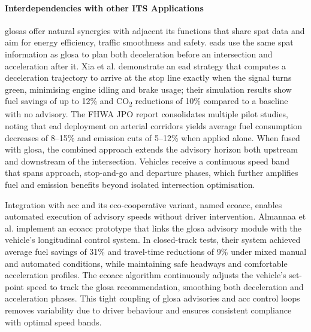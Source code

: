 \paragraph{Interdependencies with other ITS Applications}

\acp{glosa} offer natural synergies with adjacent \ac{its} functions that share \ac{spat} data and aim for energy efficiency, traffic smoothness and safety. \acp{ead} use the same \ac{spat} information as \ac{glosa} to plan both deceleration before an intersection and acceleration after it. Xia et al. \cite{Xia2014} demonstrate an \ac{ead} strategy that computes a deceleration trajectory to arrive at the stop line exactly when the signal turns green, minimising engine idling and brake usage; their simulation results show fuel savings of up to 12\% and CO\textsubscript{2} reductions of 10\% compared to a baseline with no advisory. The FHWA JPO report \cite{FHWA2016} consolidates multiple pilot studies, noting that \ac{ead} deployment on arterial corridors yields average fuel consumption decreases of 8–15\% and emission cuts of 5–12\% when applied alone. When fused with \ac{glosa}, the combined approach extends the advisory horizon both upstream and downstream of the intersection. Vehicles receive a continuous speed band that spans approach, stop-and-go and departure phases, which further amplifies fuel and emission benefits beyond isolated intersection optimisation.

Integration with \ac{acc} and its eco-cooperative variant, named \ac{ecoacc}, enables automated execution of advisory speeds without driver intervention. Almannaa et al. \cite{Almannaa2019} implement an \ac{ecoacc} prototype that links the \ac{glosa} advisory module with the vehicle’s longitudinal control system. In closed-track tests, their system achieved average fuel savings of 31\% and travel-time reductions of 9\% under mixed manual and automated conditions, while maintaining safe headways and comfortable acceleration profiles. The \ac{ecoacc} algorithm continuously adjusts the vehicle’s set-point speed to track the \ac{glosa} recommendation, smoothing both deceleration and acceleration phases. This tight coupling of \ac{glosa} advisories and \ac{acc} control loops removes variability due to driver behaviour and ensures consistent compliance with optimal speed bands.

